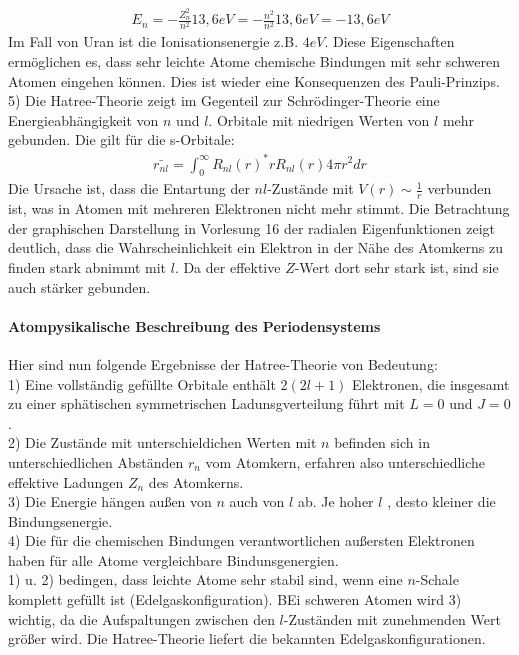 \documentclass[10pt,a4paper]{article}
\begin{document}
\begin{align}
E_n=- \frac{Z_n^2}{n^2}13,6 eV =- \frac{n^2}{n^2}13,6 eV = -13,6 eV
\end{align}
Im Fall von Uran ist die Ionisationsenergie z.B. $4 eV$. Diese Eigenschaften ermöglichen es, dass sehr leichte Atome chemische Bindungen mit sehr schweren Atomen eingehen können. Dies ist wieder eine Konsequenzen des Pauli-Prinzips.\\
5) Die Hatree-Theorie zeigt im Gegenteil zur Schrödinger-Theorie eine Energieabhängigkeit von $n$ und $l$. Orbitale mit niedrigen Werten von $l$ mehr gebunden. Die gilt für die s-Orbitale:
\begin{align}
\bar{r_{nl}} =\int_0^{\infty} R_{nl} (r)^* rR_{nl} (r) 4 \pi r^2 dr
\end{align}
Die Ursache ist, dass die Entartung der $nl$-Zustände mit $ V(r) \sim \frac{1}{r} $ verbunden ist, was in Atomen mit mehreren Elektronen nicht mehr stimmt. Die Betrachtung der graphischen Darstellung in Vorlesung 16 der radialen Eigenfunktionen zeigt deutlich, dass die Wahrscheinlichkeit ein Elektron in der Nähe des Atomkerns zu finden stark abnimmt mit $l$. Da der effektive $Z$-Wert dort sehr stark ist, sind sie auch stärker gebunden.
\paragraph{Atompysikalische Beschreibung des Periodensystems} $\,$\\
Hier sind nun folgende Ergebnisse der Hatree-Theorie von Bedeutung:\\
1) Eine vollständig gefüllte Orbitale enthält $2(2l+1)$ Elektronen, die insgesamt zu einer sphätischen symmetrischen Ladunsgverteilung führt mit $ L=0$ und $J=0$.\\
2) Die Zustände mit unterschieldichen Werten mit $n$ befinden sich in unterschiedlichen Abständen $r_n$ vom Atomkern, erfahren also unterschiedliche effektive Ladungen $Z_n $ des Atomkerns.\\
3) Die Energie hängen außen von $n$ auch von $l$ ab. Je hoher $l$ , desto kleiner die Bindungsenergie.\\
4) Die für die chemischen Bindungen verantwortlichen außersten Elektronen haben für alle Atome vergleichbare Bindunsgenergien.\\
1) u. 2) bedingen, dass leichte Atome sehr stabil sind, wenn eine $n$-Schale komplett gefüllt ist (Edelgaskonfiguration). BEi schweren Atomen wird 3) wichtig, da die Aufspaltungen zwischen den $l$-Zuständen mit zunehmenden Wert größer wird. Die Hatree-Theorie liefert die bekannten Edelgaskonfigurationen.
\end{document}
